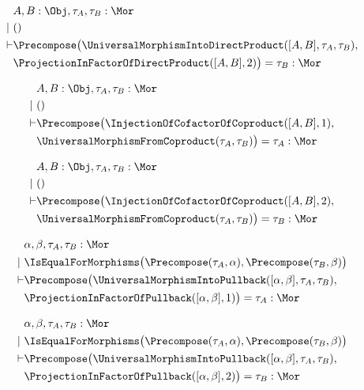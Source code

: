 \begin{sequent}
\begin{align*}
&A, B:\Obj, \tau_A, \tau_B:\Mor\\
  | ~&() \\
  \vdash &\Precompose\big(\UniversalMorphismIntoDirectProduct( [A,B], \tau_A, \tau_B ), \\
  &\ProjectionInFactorOfDirectProduct( [A,B], 2 ) \big) = \tau_B:\Mor
\end{align*}
\end{sequent}

\begin{sequent}
\begin{align*}
  &A, B:\Obj, \tau_A, \tau_B:\Mor \\
  |~ &()\\
  \vdash &\Precompose\big(\InjectionOfCofactorOfCoproduct( [A, B], 1 ),\\
  &\UniversalMorphismFromCoproduct( \tau_A, \tau_B ) \big) = \tau_A:\Mor
\end{align*}
\end{sequent}

\begin{sequent}
\begin{align*}
  &A, B:\Obj, \tau_A, \tau_B:\Mor \\
  |~ &()\\
  \vdash &\Precompose\big(\InjectionOfCofactorOfCoproduct( [A, B], 2 ),\\
  &\UniversalMorphismFromCoproduct( \tau_A, \tau_B ) \big) = \tau_B:\Mor
\end{align*}
\end{sequent}


\begin{sequent}
\begin{align*}
  &\alpha, \beta, \tau_A, \tau_B:\Mor \\
  |~ &\IsEqualForMorphisms\big( \Precompose( \tau_A, \alpha ), \Precompose( \tau_B, \beta ) \big)\\
  \vdash &\Precompose\big( \UniversalMorphismIntoPullback( [\alpha, \beta], \tau_A, \tau_B ), \\
  &\ProjectionInFactorOfPullback( [\alpha, \beta], 1 ) \big) = \tau_A: \Mor
\end{align*}
\end{sequent}

\begin{sequent}
\begin{align*}
  &\alpha, \beta, \tau_A, \tau_B:\Mor \\
  |~ &\IsEqualForMorphisms\big( \Precompose( \tau_A, \alpha ), \Precompose( \tau_B, \beta ) \big)\\
  \vdash &\Precompose\big( \UniversalMorphismIntoPullback( [\alpha, \beta], \tau_A, \tau_B ), \\
  &\ProjectionInFactorOfPullback( [\alpha, \beta], 2 ) \big) = \tau_B: \Mor
\end{align*}
\end{sequent}

